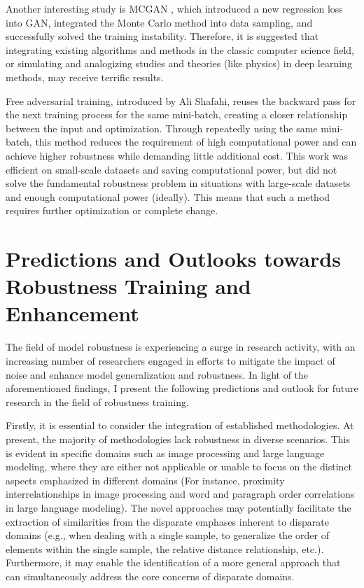 \documentclass{article}
\begin{document}
Another interesting study is MCGAN \cite{xiao2024mcganenhancinggantraining}, which introduced a new regression loss into GAN, integrated the Monte Carlo method into data sampling, and successfully solved the training instability. Therefore, it is suggested that integrating existing algorithms and methods in the classic computer science field, or simulating and analogizing studies and theories (like physics) in deep learning methods, may receive terrific results.

Free adversarial training, introduced by Ali Shafahi, reuses the backward pass for the next training process for the same mini-batch, creating a closer relationship between the input and optimization. Through repeatedly using the same mini-batch, this method reduces the requirement of high computational power and can achieve higher robustness while demanding little additional cost. This work was efficient on small-scale datasets and saving computational power, but did not solve the fundamental robustness problem in situations with large-scale datasets and enough computational power (ideally). This means that such a method requires further optimization or complete change.



\section{Predictions and Outlooks towards Robustness Training and Enhancement}

The field of model robustness is experiencing a surge in research activity, with an increasing number of researchers engaged in efforts to mitigate the impact of noise and enhance model generalization and robustness. In light of the aforementioned findings, I present the following predictions and outlook for future research in the field of robustness training.

Firstly, it is essential to consider the integration of established methodologies. At present, the majority of methodologies lack robustness in diverse scenarios. This is evident in specific domains such as image processing and large language modeling, where they are either not applicable or unable to focus on the distinct aspects emphasized in different domains (For instance, proximity interrelationships in image processing and word and paragraph order correlations in large language modeling). The novel approaches may potentially facilitate the extraction of similarities from the disparate emphases inherent to disparate domains (e.g., when dealing with a single sample, to generalize the order of elements within the single sample, the relative distance relationship, etc.). Furthermore, it may enable the identification of a more general approach that can simultaneously address the core concerns of disparate domains.
\end{document}

